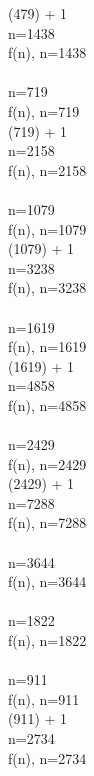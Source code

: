 \documentclass{article}
\begin{document}
 (479) + 1
 \\ 
 \Rightarrow n=1438
 \\[3mm] 
f(n), n=1438
 \\ 
 \Rightarrow {} 
 \\ 
 \Rightarrow n=719
 \\[3mm] 
f(n), n=719
 \\ 
 (719) + 1
 \\ 
 \Rightarrow n=2158
 \\[3mm] 
f(n), n=2158
 \\ 
 \Rightarrow {} 
 \\ 
 \Rightarrow n=1079
 \\[3mm] 
f(n), n=1079
 \\ 
 (1079) + 1
 \\ 
 \Rightarrow n=3238
 \\[3mm] 
f(n), n=3238
 \\ 
 \Rightarrow {} 
 \\ 
 \Rightarrow n=1619
 \\[3mm] 
f(n), n=1619
 \\ 
 (1619) + 1
 \\ 
 \Rightarrow n=4858
 \\[3mm] 
f(n), n=4858
 \\ 
 \Rightarrow {} 
 \\ 
 \Rightarrow n=2429
 \\[3mm] 
f(n), n=2429
 \\ 
 (2429) + 1
 \\ 
 \Rightarrow n=7288
 \\[3mm] 
f(n), n=7288
 \\ 
 \Rightarrow {} 
 \\ 
 \Rightarrow n=3644
 \\[3mm] 
f(n), n=3644
 \\ 
 \Rightarrow {} 
 \\ 
 \Rightarrow n=1822
 \\[3mm] 
f(n), n=1822
 \\ 
 \Rightarrow {} 
 \\ 
 \Rightarrow n=911
 \\[3mm] 
f(n), n=911
 \\ 
 (911) + 1
 \\ 
 \Rightarrow n=2734
 \\[3mm] 
f(n), n=2734
 \\ 
 \Rightarrow {} 
\end{document}
